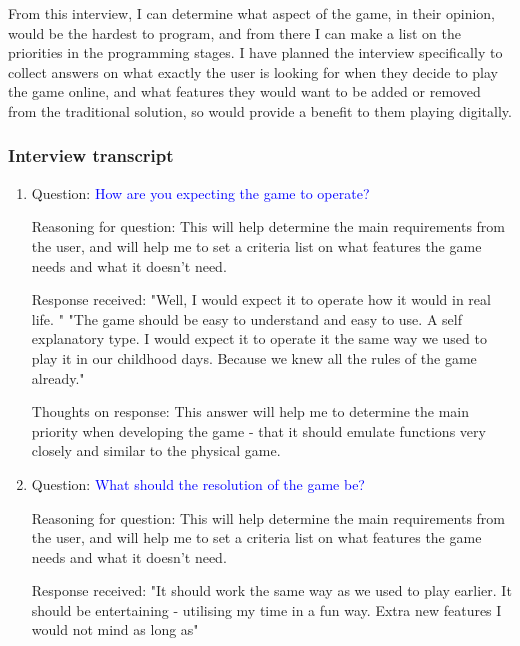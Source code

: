\documentclass[11pt,a4paper]{report}
\begin{document}
\noindent From this interview, I can determine what aspect of the game, in their opinion, would be the hardest to program, and from there I can make a list on the priorities in the programming stages. I have planned the interview specifically to collect answers on what exactly the user is looking for when they decide to play the game online, and what features they would want to be added or removed from the traditional solution, so would provide a benefit to them playing digitally. \newline

\subsubsection{Interview transcript}
\begin{enumerate}
    \item \colorbox{l-blue}{Question:} \textcolor{blue}{How are you expecting the game to operate?}

    \colorbox{l-green}{Reasoning for question:} \textcolor{dark-green}{This will help determine the main requirements from the user, and will help me to set a criteria list on what features the game needs and what it doesn't need.}

    \colorbox{l-red}{Response received:} \noindent \textcolor{crimson-red}{"Well, I would expect it to operate how it would in real life. " \newline "The game should be easy to understand and easy to use. A self explanatory type. I would expect it to operate it the same way we used to play it in our childhood days. Because we knew all the rules of the game already." }

    \colorbox{l-purple}{Thoughts on response:} \noindent \textcolor{d-purple}{This answer will help me to determine the main priority when developing the game - that it should emulate functions very closely and similar to the physical game.}




    \item \colorbox{l-blue}{Question:} \textcolor{blue}{What should the resolution of the game be?}

    \colorbox{l-green}{Reasoning for question:} \textcolor{dark-green}{This will help determine the main requirements from the user, and will help me to set a criteria list on what features the game needs and what it doesn't need.}

    \colorbox{l-red}{Response received:} \noindent \textcolor{crimson-red}{"It should work the same way as we used to play earlier. It should be entertaining - utilising my time in a fun way. Extra new features I would not mind as long as"}


\end{enumerate}
\end{document}
